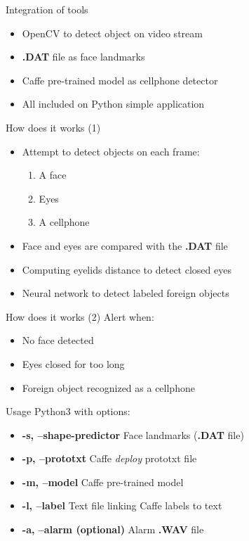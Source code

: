 \documentclass{beamer}
\begin{document}
\begin{frame}{Integration of tools}
    \begin{itemize}
        \item OpenCV to detect object on video stream
        \item \textbf{.DAT} file as face landmarks
        \item Caffe pre-trained model as cellphone detector
        \item All included on Python simple application
    \end{itemize}
\end{frame}

\begin{frame}{How does it works (1)}
    \begin{itemize}
        \item Attempt to detect objects on each frame:
            \begin{enumerate}
                \item A face
                \item Eyes
                \item A cellphone
            \end{enumerate}
        \item Face and eyes are compared with the \textbf{.DAT} file
        \item Computing eyelids distance to detect closed eyes
        \item Neural network to detect labeled foreign objects
    \end{itemize}
\end{frame}

\begin{frame}{How does it works (2)}
         Alert when:
            \begin{itemize}
                \item No face detected
                \item Eyes closed for too long
                \item Foreign object recognized as a cellphone
            \end{itemize}
\end{frame}

\begin{frame}{Usage}
    Python3 with options:
    \begin{itemize}
        \item \textbf{-s, --shape-predictor} Face landmarks (\textbf{.DAT} file)
        \item \textbf{-p, --prototxt} Caffe \textit{deploy} prototxt file
        \item \textbf{-m, --model} Caffe pre-trained model
        \item \textbf{-l, --label} Text file linking Caffe labels to text
        \item \textbf{-a, --alarm (optional)} Alarm \textbf{.WAV} file
    \end{itemize}
\end{frame}
\end{document}
